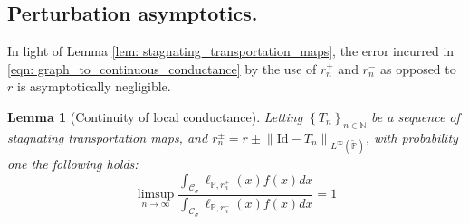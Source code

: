 \documentclass{article}
\newcommand{\norm}[1]{\left\lVert#1\right\rVert}
\newcommand{\set}[1]{\left\{#1\right\}}
\newcommand{\seq}[1]{\set{#1}_{n \in \N}}
\newcommand{\N}{\mathbb{N}}
\newcommand{\Cset}{\mathcal{C}}
\newcommand{\Csig}{\Cset_{\sigma}}
\newcommand{\Pbb}{\mathbb{P}}
\newcommand{\1}{\mathbf{1}}
\theoremstyle{alden}
\theoremstyle{aldenthm}
\newtheorem{lemma}{Lemma}
\theoremstyle{remark}
\begin{document}
\subsection{Perturbation asymptotics.}

In light of Lemma \ref{lem: stagnating_transportation_maps}, the error incurred in \eqref{eqn: graph_to_continuous_conductance} by the use of $r_n^{+}$ and $r_n^{-}$ as opposed to $r$ is asymptotically negligible.

\begin{lemma}[Continuity of local conductance]
	\label{lem: cont_local_conductance}
	Letting $\seq{T_n}$ be a sequence of stagnating transportation maps, and $r_n^{\pm} = r \pm \norm{\mathrm{Id} - T_n}_{L^{\infty}(\widetilde{\Pbb})}$, with probability one the following holds:
	\begin{equation*}
	\limsup_{n \to \infty} \frac{\int_{\Csig} \ell_{\Pbb,r_n^+}(x) f(x) dx}{\int_{\Csig} \ell_{\Pbb,r_n^-}(x) f(x) dx} = 1
	\end{equation*}
\end{lemma}
\end{document}
